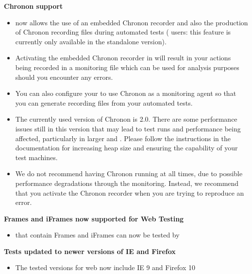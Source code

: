 \textbf{Chronon support}
\begin{itemize}
\item \app{} now allows the use of an embedded Chronon recorder and also the production of Chronon recording files during automated tests (\jb{} users: this feature is currently only available in the standalone version). 
\item Activating the embedded Chronon recorder in \app{} will result in your actions being recorded in a monitoring file which can be used for analysis purposes should you encounter any errors.
\item You can also configure your \gdaut{} to use Chronon as a monitoring agent so that you can generate recording files from your automated tests. 
\item The currently used version of Chronon is 2.0. There are some performance issues still in this version that may lead to test runs and performance being affected, particularly in larger \gdauts{} and \gdprojects{}. Please follow the instructions in the documentation for increasing heap size and ensuring the capability of your test machines. 
\item We do not recommend having Chronon running at all times, due to possible performance degradations through the monitoring. Instead, we recommend that you activate the Chronon recorder when you are trying to reproduce an error.
\end{itemize}


\textbf{Frames and iFrames now supported for Web Testing}
\begin{itemize}
\item \gdauts{} that contain Frames and iFrames can now be tested by \app{}
\end{itemize}

\textbf{Tests updated to newer versions of IE and Firefox}
\begin{itemize}
\item The tested versions for web \gdauts{} now include IE 9 and Firefox 10
\end{itemize}

